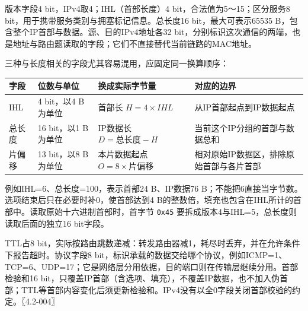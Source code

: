 版本字段4 bit，IPv4取4；IHL（首部长度）4 bit，合法值为5～15；区分服务8 bit，用于携带服务类别与拥塞标记信息。总长度16 bit，最大可表示65535 B，包含整个IP首部与数据。源、目的IPv4地址各32 bit，分别标识这次通信的两端，也是地址与路由题读取的字段；它们不直接替代当前链路的MAC地址。

三种与长度相关的字段尤其容易混用，应固定同一换算顺序：

\begin{wideblock}

\par\medskip\noindent\begin{minipage}{\linewidth}\fontsize{9.3}{12}\selectfont\begin{tabularx}{\linewidth}{@{}YYYY@{}}
\toprule\noalign{}
\begin{minipage}[b]{\linewidth}\raggedright
字段
\end{minipage} & \begin{minipage}[b]{\linewidth}\raggedright
位数与单位
\end{minipage} & \begin{minipage}[b]{\linewidth}\raggedright
换成实际字节量
\end{minipage} & \begin{minipage}[b]{\linewidth}\raggedright
对应的边界
\end{minipage} \\
\midrule\noalign{}


IHL & 4 bit，以4 B为单位 & 首部长 \(H=4\times IHL\) & 从IP首部起点到IP数据起点 \\
总长度 & 16 bit，以1 B为单位 & IP数据长 \(D=总长度-H\) & 当前这个IP分组的首部与数据总和 \\
片偏移 & 13 bit，以8 B为单位 & 本片数据起点 \(O=8\times\text{片偏移}\) & 相对原始IP数据区，排除原始首部与各片首部 \\
\bottomrule\end{tabularx}
\end{minipage}\par\medskip

\end{wideblock}

例如IHL=6、总长度=100，表示首部24 B、IP数据76 B；不能把6直接当字节数。选项结束后只在必要时补0，使首部达到4 B的整数倍，填充也包含在IHL所计的首部中。读取原始十六进制首部时，首字节 \texttt{0x45} 要拆成版本4与IHL=5，总长度则读取后面的独立16 bit字段。

TTL占8 bit，实际按路由跳数递减：转发路由器减1，耗尽时丢弃，并在允许条件下报告超时。协议字段8 bit，标识承载的数据交给哪个协议，例如ICMP=1、TCP=6、UDP=17；它是网络层分用依据，目的端口则在传输层继续分用。首部检验和16 bit，只覆盖IP首部（含选项、填充），不覆盖IP数据，也不加入伪首部；TTL等首部内容变化后须更新检验和。IPv4没有以全0字段关闭首部校验的约定。〖4.2-004〗

